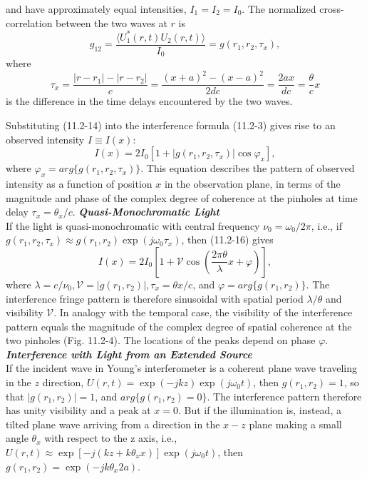 \documentclass{article}
\numberwithin{figure}{subsection}
\numberwithin{table}{subsection}
\begin{document}
and have approximately equal intensities, $ I_1 = I_2 = I_0 $. The normalized cross-correlation between the two waves at $r$ is
\begin{equation}
g_{12} = \frac{\langle U_1^\ast (r, t) U_2 (r, t) \rangle}{I_0} = g(r_1, r_2, \tau_x),
\end{equation}
where
\begin{equation}
\tau_x = \frac{\lvert r - r_1 \rvert - \lvert r - r_2 \rvert}{c} = \frac{(x + a)^2 - (x - a)^2}{2dc} = \frac{2ax}{dc} = \frac{\theta}{c}x
\end{equation}
is the difference in the time delays encountered by the two waves.
\par Substituting (11.2-14) into the interference formula (11.2-3) gives rise to an observed intensity $ I \equiv I(x) $:
\begin{equation}
I(x) = 2 I_0 [1 + \lvert g(r_1, r_2, \tau_x) \rvert \cos \varphi_x] ,
\end{equation}
where $ \varphi_x = arg\{g(r_1, r_2, \tau_x)\}$. This equation describes the pattern of observed intensity as a function of position $x$ in the observation plane, in terms of the magnitude and phase of the complex degree of coherence at the pinholes at time delay $ \tau_x = \theta_x / c$.
\bigbreak\noindent\textcolor{ksc}{\textbf{\textsl{Quasi-Monochromatic Light}}}\\
If the light is quasi-monochromatic with central frequency $ \nu_0 = \omega_0 / 2\pi$, i.e., if $ g(r_1, r_2, \tau_x) \approx g(r_1, r_2) \exp (j\omega_0 \tau_x) $, then (11.2-16) gives
\begin{equation}
I(x) = 2 I_0 [1 + \mathcal{V} \cos (\frac{2\pi \theta}{\lambda}x + \varphi)] ,
\end{equation}
where $ \lambda = c / \nu_0, \mathcal{V} = \lvert g(r_1, r_2) \rvert, \tau_x = \theta x / c $, and $ \varphi = arg\{g(r_1, r_2)\}$. The interference fringe pattern is therefore sinusoidal with spatial period $ \lambda / \theta $ and visibility $ \mathcal{V} $. In analogy with the temporal case, the visibility of the interference pattern equals the magnitude of the complex degree of spatial coherence at the two pinholes (Fig. 11.2-4). The locations of the peaks depend on phase $\varphi$.
\bigbreak\noindent\textcolor{ksc}{\textbf{\textsl{Interference with Light from an Extended Source}}}\\
If the incident wave in Young's interferometer is a coherent plane wave traveling in the $z$ direction, $ U(r,t) = \exp(-jkz) \exp(j\omega_0 t) $, then $ g(r_1, r_2) = 1 $, so that $ \lvert g(r_1, r_2) \rvert = 1 $, and $ arg\{g(r_1, r_2) = 0\} $. The interference pattern therefore has unity visibility and a peak at $ x = 0 $. But if the illumination is, instead, a tilted plane wave arriving from a direction in the $x-z$ plane making a small angle $\theta_x$ with respect to the z axis, i.e., $ U(r,t) \approx \exp[-j(kz + k\theta_x x)] \exp (j\omega_0 t) $, then $ g(r_1, r_2) = \exp(-jk\theta_x 2a) $.
\end{document}
